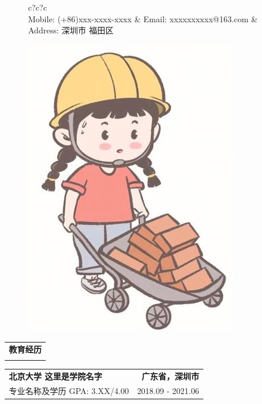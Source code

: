 \documentclass[letterpaper,10pt]{article}
\makeatletter
\newcommand{\thickhline}{\Xhline{2pt}} %
\newcommand{\sectiontitle}[1]{
	\begin{tabular*}{\textwidth}{l}
		{\Large \textbf{#1}} \\
		\thickhline
	\end{tabular*}
	\vspace{-0.8em}
}
\newcommand{\educationsection}[4]{
	\begin{tabular*}{\textwidth}{l@{\extracolsep{\fill}}r}
		\textbf{#1} & \textbf{#2} \\
		#3 & #4
	\end{tabular*}
}
\makeatother
\begin{document}

\centering

\begin{figure}
	\begin{minipage}[h]{0.85\textwidth} 
		\flushright
		\begin{tabular}{c?c?c}
			 \\
			{\small Mobile: (+86)xxx-xxxx-xxxx} &
			{\small Email: xxxxxxxxxx@163.com} &
			{\small Address: 深圳市 \space 福田区} \\ 
		\end{tabular}
		\vspace{-2em}
	\end{minipage}
	\hfill
	\begin{minipage}[h]{0.14\textwidth}
		\centering
		\includegraphics[width=0.8\linewidth]{photo_5_7} %
		\vspace{-2em}
	\end{minipage}
\end{figure}

\sectiontitle{教育经历}

\educationsection{北京大学 \space 这里是学院名字}{广东省，深圳市}{专业名称及学历 \space GPA: 3.XX/4.00}{2018.09 - 2021.06}
\end{document}
